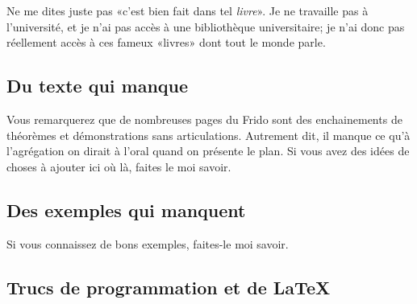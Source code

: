 Ne me dites juste pas «c'est bien fait dans tel \emph{livre}». Je ne travaille pas à l'université, et je n'ai pas accès à une bibliothèque universitaire; je n'ai donc pas réellement accès à ces fameux «livres» dont tout le monde parle.

\subsection{Du texte qui manque}

Vous remarquerez que de nombreuses pages du Frido sont des enchainements de théorèmes et démonstrations sans articulations. Autrement dit, il manque ce qu'à l'agrégation on dirait à l'oral quand on présente le plan. Si vous avez des idées de choses à ajouter ici où là, faites le moi savoir.

\subsection{Des exemples qui manquent}

Si vous connaissez de bons exemples, faites-le moi savoir.

\subsection{Trucs de programmation et de \LaTeX}

